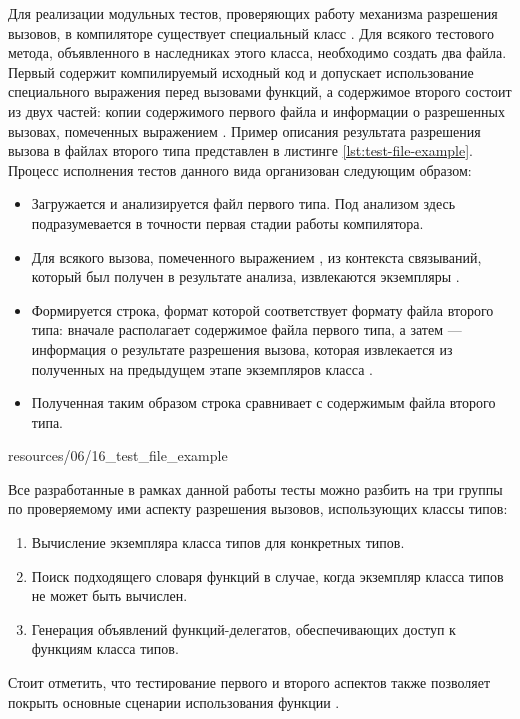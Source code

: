 Для реализации модульных тестов, проверяющих работу механизма разрешения вызовов, в компиляторе существует специальный класс . Для всякого тестового метода, объявленного в наследниках этого класса, необходимо создать два файла. Первый содержит компилируемый исходный код и допускает использование специального выражения  перед вызовами функций, а содержимое второго состоит из двух частей: копии содержимого первого файла и информации о разрешенных вызовах, помеченных выражением . Пример описания результата разрешения вызова в файлах второго типа представлен в листинге \ref{lst:test-file-example}. Процесс исполнения тестов данного вида организован следующим образом:
\begin{itemize}
    \item Загружается и анализируется файл первого типа. Под анализом здесь подразумевается в точности первая стадии работы компилятора.
    \item Для всякого вызова, помеченного выражением , из контекста связываний, который был получен в результате анализа, извлекаются экземпляры . 
    \item Формируется строка, формат которой соответствует формату файла второго типа: вначале располагает содержимое файла первого типа, а затем --- информация о результате разрешения вызова, которая извлекается из полученных на предыдущем этапе экземпляров класса . 
    \item Полученная таким образом строка сравнивает с содержимым файла второго типа.
\end{itemize}


{resources/06/16_test_file_example}  

Все разработанные в рамках данной работы тесты можно разбить на три группы по проверяемому ими аспекту разрешения вызовов, использующих классы типов:
\begin{enumerate}
    \item Вычисление экземпляра класса типов для конкретных типов.
    \item Поиск подходящего словаря функций в случае, когда экземпляр класса типов не может быть вычислен.  
    \item Генерация объявлений функций-делегатов, обеспечивающих доступ к функциям класса типов.  
\end{enumerate}
Стоит отметить, что тестирование первого и второго аспектов также позволяет покрыть основные сценарии использования функции .

